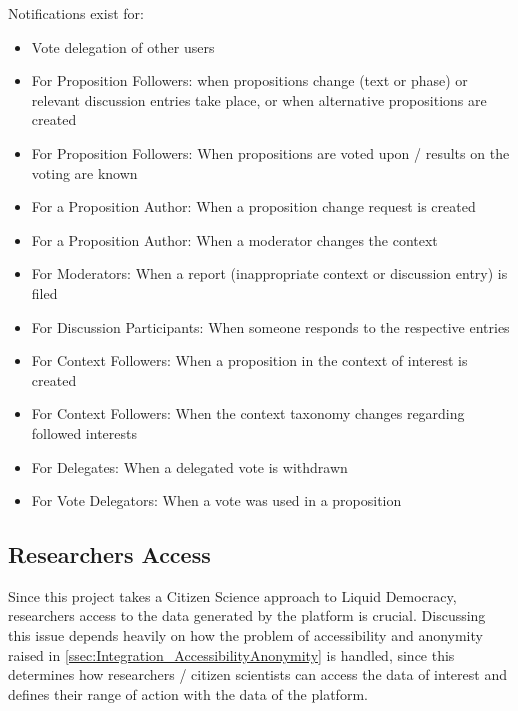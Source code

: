 Notifications exist for:
\begin{itemize}
\item Vote delegation of other users 
\item For Proposition Followers: when propositions change (text or phase) or relevant discussion entries take place, or when alternative propositions are created
\item For Proposition Followers: When propositions are voted upon / results on the voting are known
\item For a Proposition Author: When a proposition change request is created
\item For a Proposition Author: When a moderator changes the context
\item For Moderators: When a report (inappropriate context or discussion entry) is filed
\item For Discussion Participants: When someone responds to the respective entries
\item For Context Followers: When a proposition in the context of interest is created
\item For Context Followers: When the context taxonomy changes regarding followed interests
\item For Delegates: When a delegated vote is withdrawn
\item For Vote Delegators: When a vote was used in a proposition 
\end{itemize}

\subsection{Researchers Access}
\label{sec:Model_ResearchersAccess}
% 
% 
% 
Since this project takes a Citizen Science approach to Liquid Democracy, researchers access to the data generated by the platform is crucial. Discussing this issue depends heavily on how the problem of accessibility and anonymity raised in \ref{ssec:Integration_AccessibilityAnonymity} is handled, since this determines how researchers / citizen scientists can access the data of interest and defines their range of action with the data of the platform. 

